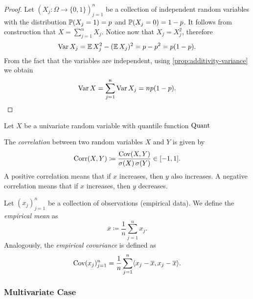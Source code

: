 \begin{proof}
    Let \((X_j: \Omega \to \{0, 1\})_{j=1}^n\) be a collection of independent random
    variables with the distribution \(\operatorname{\mathbb{P}}(X_j = 1) = p\) and
    \(\operatorname{\mathbb{P}}(X_j = 0) = 1 - p\). It follows from construction that \(X = \sum_{j=1}^n
    X_j\). Notice now that \(X_j = X_j^2\), therefore
    \[
        \operatorname{Var} X_j = \operatorname{\mathbb{E}} X_j^2 - (\operatorname{\mathbb{E}} X_j)^2 = p - p^2 = p(1 - p).
    \]
    From the fact that the variables are independent, using
    \cref{prop:additivity-variance} we obtain
    \[
        \operatorname{Var} X = \sum_{j=1}^n \operatorname{Var} X_j = n p (1 - p).
    \]
\end{proof}

\begin{definition}
    \label{def:interquartile-range}
    Let \(X\) be a univariate random variable with quantile function \(\operatorname{Quant}\)
\end{definition}

\begin{definition}[Correlation]
    \label{def:correlation}
    The \emph{correlation} between two random variables \(X\) and \(Y\) is given by
    \[
        \operatorname{Corr}(X, Y) \coloneq \frac{\operatorname{Cov}(X, Y)}{\operatorname{\sigma}(X) \operatorname{\sigma}(Y)} \in [-1, 1].
    \]
    A positive correlation means that if \(x\) increases, then \(y\) also
    increases. A negative correlation means that if \(x\) increases, then \(y\)
    decreases.
\end{definition}

\begin{definition}
    \label{def:empirical-mean-and-covariance}
    Let \((x_j)_{j=1}^{n}\) be a collection of observations (empirical data). We
    define the \emph{empirical mean} as
    \[
        \overline x \coloneq \frac{1}{n} \sum_{j=1}^n x_j.
    \]
    Analogously, the \emph{empirical covariance} is defined as
    \[
        \operatorname{Cov}(x_j)_{j=1}^n
        = \frac{1}{n} \sum_{j=1}^n \langle x_j - \overline x, x_j - \overline x \rangle.
    \]
\end{definition}

\subsubsection{Multivariate Case}

